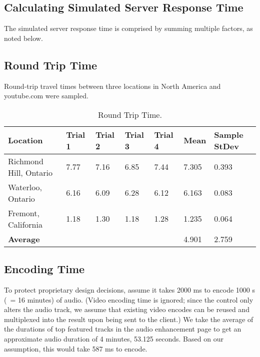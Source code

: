 \documentclass[se]{uw-wkrpt}
\begin{document}
\appendix
\begin{appendices}

\section{Calculating Simulated Server Response Time}\label{app:calculating}
The simulated server response time is comprised by summing multiple
factors, as noted below.

\subsection{Round Trip Time}
Round-trip travel times between three locations in North America and
youtube.com were sampled.

\begin{table}
  \caption{Round Trip Time.}
  \label{tbl:rtt}
  \centering
  \begin{tabular}{|p{2.0cm}|p{2.0cm}|p{2.0cm}|p{2.0cm}|p{2.0cm}|p{2.0cm}|
                   p{2.0cm}|}
    \hline
    \textbf{Location} &
    \textbf{Trial 1} &
    \textbf{Trial 2} &
    \textbf{Trial 3} &
    \textbf{Trial 4} &
    \textbf{Mean} &
    \textbf{Sample StDev} \\
    \hline
    \hline
    Richmond Hill, Ontario &
      7.77 & 7.16 & 6.85 & 7.44 & 7.305 & 0.393 \\
    \hline
    Waterloo, Ontario &
      6.16 & 6.09 & 6.28 & 6.12 & 6.163 & 0.083 \\
    \hline
    Fremont, California &
      1.18 & 1.30 & 1.18 & 1.28 & 1.235 & 0.064 \\
    \hline
    \hline
    \multicolumn{5}{|p{10.0cm}|}{\textbf{Average}} &
      4.901 & 2.759 \\
    \hline
  \end{tabular}
\end{table}

\subsection{Encoding Time}
To protect proprietary design decisions, assume it takes 2000 ms to encode
1000 s (~= 16 minutes) of audio. (Video encoding time is ignored; since
the control only alters the audio track, we assume that existing video
encodes can be reused and multiplexed into the result upon being sent to
the client.) We take the average of the durations of top featured tracks
in the audio enhancement page to get an approximate audio duration of 4
minutes, 53.125 seconds. Based on our assumption, this would take 587 ms
to encode.


\end{appendices}
\end{document}
